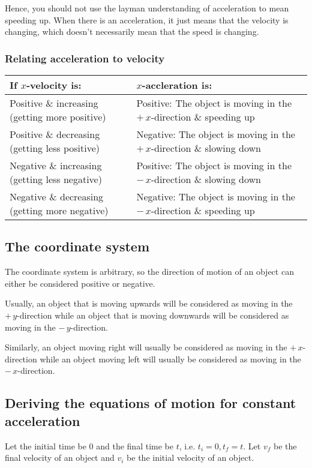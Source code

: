 \documentclass[11pt]{article}
\begin{document}
Hence, you should not use the layman understanding of acceleration to mean speeding up. When there is an acceleration, it just means that the velocity is changing, which doesn't necessarily mean that the speed is changing.
\subsubsection{Relating acceleration to velocity}
\label{sec:orgb57a1a1}

\begin{center}
\begin{tabular}{ |m{11em}|m{11em}| }
\hline
If $x$-velocity is: & $x$-accleration is: \\
\hline
Positive \& increasing (getting more positive) & Positive: The object is moving in the $+ \, x$-direction \& speeding up \\
\hline
Positive \& decreasing (getting less positive) & Negative: The object is moving in the $+ \, x$-direction \& slowing down \\
\hline
Negative \& increasing (getting less negative) & Positive: The object is moving in the $- \, x$-direction \& slowing down \\
\hline
Negative \& decreasing (getting more negative) & Negative: The object is moving in the $- \, x$-direction \& speeding up \\
\hline
\end{tabular}
\end{center}
\subsection{The coordinate system}
\label{sec:orgc61a2bc}
The coordinate system is arbitrary, so the direction of motion of an object can either be considered positive or negative.


Usually, an object that is moving upwards will be considered as moving in the \(+ \, y\)-direction while an object that is moving downwards will be considered as moving in the \(- \, y\)-direction.


Similarly, an object moving right will usually be considered as moving in the \(+ \, x\)-direction while an object moving left will usually be considered as moving in the \(- \, x\)-direction.
\subsection{Deriving the equations of motion for constant acceleration}
\label{sec:orgdcff721}
Let the initial time be 0 and the final time be \(t\), i.e. \(t_i = 0, t_f = t\). Let \(v_f\) be the final velocity of an object and \(v_i\) be the initial velocity of an object.
\end{document}
